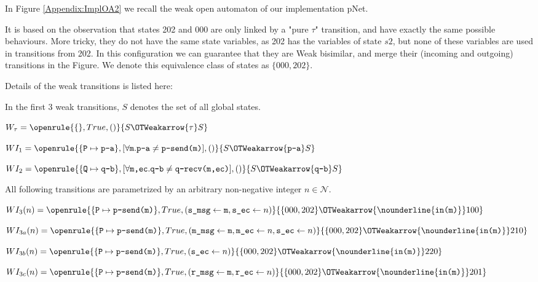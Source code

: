 In Figure \ref{Appendix:ImplOA2} we recall the weak open automaton of our implementation pNet. 

It is based on the observation that states 202 and 000 are only linked by a "pure $\tau$" transition, and have exactly the same possible behaviours.
More tricky, they do not have the same state variables, as 202 has the variables of state $s2$, but none of these variables are used in transitions from 202.
In this configuration we can guarantee that they are Weak bisimilar, and merge their (incoming and outgoing) transitions in the Figure. We denote this 
equivalence class of states as $\{000,202\}$.


Details of the weak transitions is listed here:

In the first 3 weak transitions, $S$ denotes the set of all global states.

$ W_\tau = \openrule
{\{\}, True, ()}
{S \OTWeakarrow {\tau} S}$

$ WI_1 = \openrule
{\{\texttt{P}\mapsto \texttt{p-a}\}, [\forall \texttt{m}. \texttt{p-a} \neq \texttt{p-send(m)} ], ()}
{S \OTWeakarrow {\texttt{p-a}} S}$

$ WI_2 = \openrule
{\{\texttt{Q}\mapsto \texttt{q-b}\}, [\forall \texttt{m,ec}. \texttt{q-b} \neq \texttt{q-recv(m,ec)} ], ()}
{S \OTWeakarrow {\texttt{q-b}} S}$

All following transitions are parametrized by an arbitrary non-negative integer $n\in \mathcal{N}$.


$ WI_3(n) = \openrule
  {\{\texttt{P}\mapsto \texttt{p-send(m)}\}, True,
    (\texttt{s\_msg}\gets \texttt{m}, \texttt{s\_ec}\gets n)}
  { \{000,202\} \OTWeakarrow {\nounderline{\texttt{in(m)}}} 100}
$

$ WI_{3a}(n) = \openrule
  {\{\texttt{P}\mapsto \texttt{p-send(m)}\}, True,
    (\texttt{m\_msg}\gets \texttt{m}, \texttt{m\_ec}\gets n, \texttt{s\_ec}\gets n)}
  { \{000,202\} \OTWeakarrow {\nounderline{\texttt{in(m)}}} 210}
$

$ WI_{3b}(n) = \openrule
  {\{\texttt{P}\mapsto \texttt{p-send(m)}\}, True,
    (\texttt{s\_ec}\gets n)}
  { \{000,202\} \OTWeakarrow {\nounderline{\texttt{in(m)}}} 220}
$

$ WI_{3c}(n) = \openrule
  {\{\texttt{P}\mapsto \texttt{p-send(m)}\}, True,
    (\texttt{r\_msg}\gets \texttt{m}, \texttt{r\_ec}\gets n)}
  { \{000,202\} \OTWeakarrow {\nounderline{\texttt{in(m)}}} 201}
$


